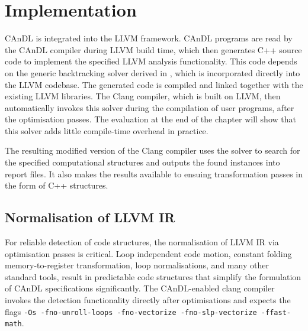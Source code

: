 \section{Implementation}

    CAnDL is integrated into the LLVM framework.
    CAnDL programs are read by the CAnDL compiler during LLVM build time, which
    then generates C++ source code to implement the specified LLVM analysis
    functionality.
    This code depends on the generic backtracking solver derived in
    , which is incorporated directly into the LLVM
    codebase.
    The generated code is compiled and linked together with the existing LLVM
    libraries.
    The Clang compiler, which is built on LLVM, then automatically invokes this
    solver during the compilation of user programs, after the optimisation
    passes.
    The evaluation at the end of the chapter will show that this solver adds
    little compile-time overhead in practice.

    The resulting modified version of the Clang compiler uses the solver to
    search for the specified computational structures and outputs the found
    instances into report files.
    It also makes the results available to ensuing transformation passes in the
    form of C++ structures.

    \subsection{Normalisation of LLVM IR}

    For reliable detection of code structures, the normalisation of LLVM IR via
    optimisation passes is critical.
    Loop independent code motion, constant folding memory-to-register
    transformation, loop normalisations, and many other standard
    tools, result in predictable code structures that simplify the formulation
    of CAnDL specifications significantly.
    The CAnDL-enabled clang compiler invokes the detection functionality
    directly after optimisations and expects the flags
    {\tt -Os -fno-unroll-loops -fno-vectorize -fno-slp-vectorize -ffast-math}.

